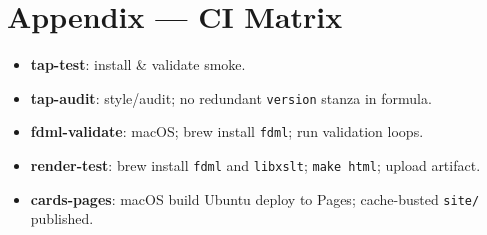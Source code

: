 \documentclass[11pt,a4paper]{article}
\begin{document}
\section{Appendix — CI Matrix}
\begin{itemize}[leftmargin=1.2em]
  \item \textbf{tap-test}: install \& validate smoke.
  \item \textbf{tap-audit}: style/audit; no redundant \texttt{version} stanza in formula.
  \item \textbf{fdml-validate}: macOS; brew install \texttt{fdml}; run validation loops.
  \item \textbf{render-test}: brew install \texttt{fdml} and \texttt{libxslt}; \texttt{make html}; upload artifact.
  \item \textbf{cards-pages}: macOS build \textrightarrow{} Ubuntu deploy to Pages; cache-busted \texttt{site/} published.
\end{itemize}
\end{document}
